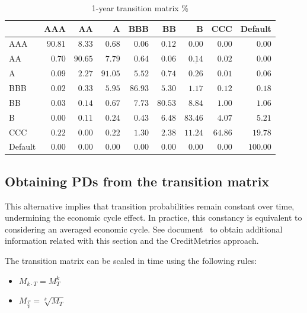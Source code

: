 \documentclass[11pt,fleqn]{book} %
\begin{document}
\begin{table}[!ht]
	\begin{center}
		\begin{tabular}[]{l|rrrrrrrr}
							& AAA     & AA      & A       & BBB     & BB      & B                  & CCC     & Default  \\
			\hline
			AAA     & $90.81$ & $8.33$  & $0.68$  & $0.06$  & $0.12$  & $0.00$             & $0.00$  & $0.00$   \\
			AA      & $0.70$  & $90.65$ & $7.79$  & $0.64$  & $0.06$  & $\underline{0.14}$ & $0.02$  & $0.00$   \\
			A       & $0.09$  & $2.27$  & $91.05$ & $5.52$  & $0.74$  & $0.26$             & $0.01$  & $0.06$   \\
			BBB     & $0.02$  & $0.33$  & $5.95$  & $86.93$ & $5.30$  & $1.17$             & $0.12$  & $0.18$   \\
			BB      & $0.03$  & $0.14$  & $0.67$  & $7.73$  & $80.53$ & $8.84$             & $1.00$  & $1.06$   \\
			B       & $0.00$  & $0.11$  & $0.24$  & $0.43$  & $6.48$  & $83.46$            & $4.07$  & $5.21$   \\
			CCC     & $0.22$  & $0.00$  & $0.22$  & $1.30$  & $2.38$  & $11.24$            & $64.86$ & $19.78$  \\
			Default & $0.00$  & $0.00$  & $0.00$  & $0.00$  & $0.00$  & $0.00$             & $0.00$  & $100.00$ \\
		\end{tabular}
		\caption{1-year transition matrix \%}
		\label{tmatrix1}
	\end{center}
\end{table}

\subsection{Obtaining PDs from the transition matrix}
\label{pdftm}

This alternative implies that transition probabilities remain constant
over time, undermining the economic cycle effect. In practice, this constancy
is equivalent to considering an averaged economic cycle. 
See document~\cite[sec. 3.2.1]{bindseil:2007} to obtain additional information
related with this section and the CreditMetrics\texttrademark{} approach.

\begin{proposition}
	The transition matrix can be scaled in time using the following rules:
	\begin{itemize}
		\item $M_{k \cdot T} = M_{T}^k$
		\item $M_{\frac{T}{k}} = \sqrt[k]{M_{T}}$
	\end{itemize}
\end{proposition}
\end{document}
